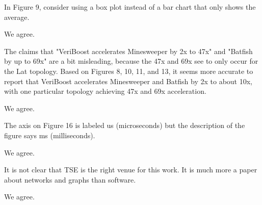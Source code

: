 \begin{revcomment}
In Figure 9, consider using a box plot instead of a bar chart that only shows the average.
\end{revcomment}
\begin{revresponse}
	We agree.
\end{revresponse}

\begin{revcomment}
The claims that "VeriBoost accelerates Minesweeper by 2x to 47x" and "Batfish by up to 69x" are a bit misleading, 
because the 47x and 69x see to only occur for the Lat topology. Based on Figures 8, 10, 11, and 13, 
it seems more accurate to report that VeriBoost accelerates Minesweeper and Batfish by 2x to about 10x, 
with one particular topology achieving 47x and 69x acceleration.
\end{revcomment}
\begin{revresponse}
	We agree.
\end{revresponse}

\begin{revcomment}
The axis on Figure 16 is labeled us (microseconds) but the description of the figure says ms (milliseconds).
\end{revcomment}
\begin{revresponse}
	We agree.
\end{revresponse}

\begin{revcomment}
It is not clear that TSE is the right venue for this work. It is much more a paper about networks and graphs than software.
\end{revcomment}
\begin{revresponse}
	We agree.
\end{revresponse}
